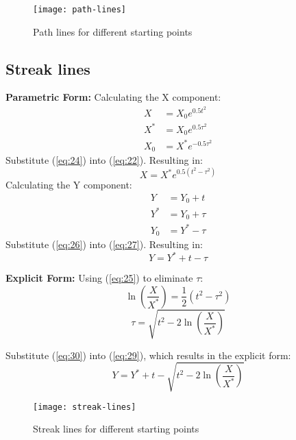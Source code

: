 \documentclass[../main.tex]{subfiles}
\begin{document}
	\begin{figure}[ht]
		\centering
		\texttt{[image: path-lines]}

		\label{fig:pathline}
		\caption{Path lines for different starting points}
	\end{figure}
	\subsection{Streak lines}
	\textbf{Parametric Form:}
	Calculating the X component:
	\begin{align}
		\label{eq:22}
		X &= X_0 e^{0.5 t^2} \\
		X^{*} &= X_0 e^{0.5 \tau ^2} \\
		\label{eq:24}
		X_0 &= X^{*} e^{-0.5 \tau ^2}
	\end{align}
	Substitute (\ref{eq:24}) into (\ref{eq:22}). Resulting in:
	\begin{equation}
		\label{eq:25}
		X = X^{*} e^{0.5(t^2 - \tau ^2)}
	\end{equation}
	Calculating the Y component:
	\begin{align}
		\label{eq:26}
		Y &= Y_0 + t \\
		Y^{*} &= Y_0 + \tau \\
		\label{eq:27}
		Y_0 &= Y^{*} - \tau
	\end{align}
	Substitute (\ref{eq:26}) into (\ref{eq:27}). Resulting in:
	\begin{equation}
		\label{eq:29}
		Y = Y^{*} + t - \tau
	\end{equation}

	\textbf{Explicit Form:}
	Using  (\ref{eq:25}) to eliminate $\tau$:
		\begin{equation*}
		\ln(\frac{X}{X^*}) = \frac{1}{2} (t^2 - \tau ^2)
		\end{equation*}
		\begin{equation}
			\label{eq:30}
			\tau = \sqrt{t^2 - 2 \ln(\frac{X}{X^*})}
		\end{equation}

		Substitute (\ref{eq:30}) into (\ref{eq:29}), which results in the explicit form:
		\begin{equation}
			Y = Y^{*} + t - \sqrt{t^2 - 2 \ln(\frac{X}{X^*})}
		\end{equation}

	\begin{figure}[ht]
		\centering
		\texttt{[image: streak-lines]}

		\label{fig:streak}
		\caption{Streak lines for different starting points}
	\end{figure}
\end{document}
